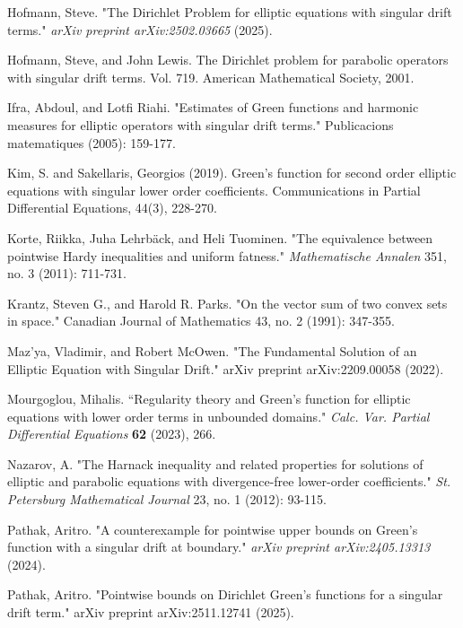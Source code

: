 \documentclass{article}
\newcounter{lem}
\theoremstyle{plain}
\theoremstyle{definition}
\theoremstyle{plain}
\begin{document}
\begin{thebibliography}{}
 Hofmann, Steve. "The Dirichlet Problem for elliptic equations with singular drift terms." \textit{arXiv preprint arXiv:2502.03665} (2025).

 Hofmann, Steve, and John Lewis. The Dirichlet problem for parabolic operators with singular drift terms. Vol. 719. American Mathematical Society, 2001.

 Ifra, Abdoul, and Lotfi Riahi. "Estimates of Green functions and harmonic measures for elliptic operators with singular drift terms." Publicacions matematiques (2005): 159-177.

 Kim, S. and Sakellaris, Georgios (2019). Green’s function for second order elliptic equations with singular lower order coefficients. Communications in Partial Differential Equations, 44(3), 228-270.

  Korte, Riikka, Juha Lehrbäck, and Heli Tuominen. "The equivalence between pointwise Hardy inequalities and uniform fatness." \textit{Mathematische Annalen} 351, no. 3 (2011): 711-731.

 Krantz, Steven G., and Harold R. Parks. "On the vector sum of two convex sets in space." Canadian Journal of Mathematics 43, no. 2 (1991): 347-355.

 Maz'ya, Vladimir, and Robert McOwen. "The Fundamental Solution of an Elliptic Equation with Singular Drift." arXiv preprint arXiv:2209.00058 (2022).


 Mourgoglou, Mihalis. ``Regularity theory and Green’s function for elliptic equations with lower order terms in unbounded domains."
\textit{Calc. Var. Partial Differential Equations} \textbf{62} (2023), 266.


 Nazarov, A. "The Harnack inequality and related properties for solutions of elliptic and parabolic equations with divergence-free lower-order coefficients." \textit{St. Petersburg Mathematical Journal} 23, no. 1 (2012): 93-115.

 Pathak, Aritro. "A counterexample for pointwise upper bounds on Green's function with a singular drift at boundary." \textit{arXiv preprint arXiv:2405.13313} (2024).

 Pathak, Aritro. "Pointwise bounds on Dirichlet Green's functions for a singular drift term." arXiv preprint arXiv:2511.12741 (2025).




\end{thebibliography}
\end{document}
